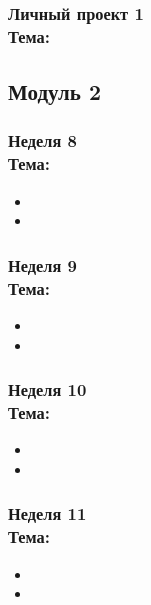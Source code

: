 \documentclass[a4paper,11pt]{article}
\begin{document}
\subsubsection{Личный проект 1\\ Тема: }


\subsection{Модуль 2}

\subsubsection{Неделя 8\\ Тема: }

\begin{itemize}
    \item 
    \item 
\end{itemize}

\subsubsection{Неделя 9\\ Тема: }

\begin{itemize}
    \item 
    \item 
\end{itemize}

\subsubsection{Неделя 10\\ Тема: }

\begin{itemize}
    \item 
    \item 
\end{itemize}

\subsubsection{Неделя 11\\ Тема: }

\begin{itemize}
    \item 
    \item 
\end{itemize}
\end{document}

